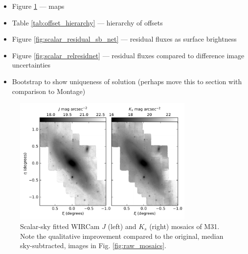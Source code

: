 \documentclass[iop]{emulateapj}
\begin{document}
\begin{itemize}
\item Figure \ref{fig:scalar_mosaics} --- maps
\item Table \ref{tab:offset_hierarchy} --- hierarchy of offsets
\item Figure \ref{fig:scalar_residual_sb_net} --- residual fluxes as surface brightness
\item Figure \ref{fig:scalar_relresidnet} --- residual fluxes compared to difference image uncertainties
\item Bootstrap to show uniqueness of solution (perhaps move this to section with comparison to Montage)
\end{itemize}

\begin{figure}[t]
	\centering
		\includegraphics[width=3.5in]{figs/scalar_mosaics}
	\caption{Scalar-sky fitted WIRCam $J$ (left) and $K_s$ (right) mosaics of M31. Note the qualitative improvement compared to the original, median sky-subtracted, images in Fig. \ref{fig:raw_mosaics}.}
	\label{fig:scalar_mosaics}
\end{figure}
\end{document}

